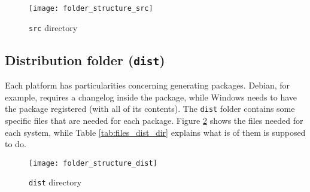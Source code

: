 \begin{figure}[h!]
\centering
\texttt{[image: folder\_structure\_src]}
\caption{\texttt{src} directory}
\label {fig:folder_structure_src}
\end{figure}

\subsection{Distribution folder (\texttt{dist})}
\label{sec:dist_folder}

Each platform has particularities concerning generating packages. Debian, for example, requires a changelog inside the package, while Windows needs to have the package registered (with all of its contents). The \texttt{dist} folder contains some specific files that are needed for each package. Figure \ref{fig:folder_structure_dist} shows the files needed for each system, while Table \ref{tab:files_dist_dir} explains what is of them is supposed to do.

\begin{figure}[h!]
\centering
\texttt{[image: folder\_structure\_dist]}
\caption{\texttt{dist} directory}
\label {fig:folder_structure_dist}
\end{figure}

